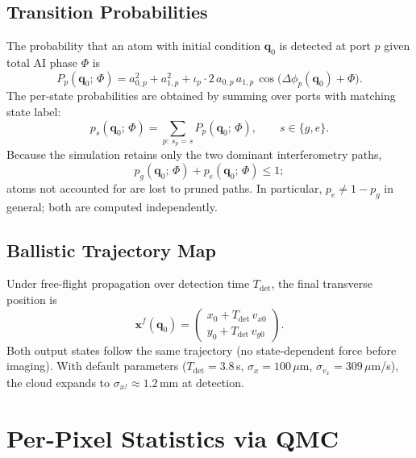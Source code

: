 \documentclass[11pt,a4paper]{article}
\newcommand{\q}{\mathbf{q}}
\newcommand{\x}{\mathbf{x}}
\begin{document}
\subsection{Transition Probabilities}

The probability that an atom with initial condition $\q_0$ is detected at port
$p$ given total AI phase $\Phi$ is
\begin{equation}
  P_p(\q_0;\,\Phi)
  = a_{0,p}^2 + a_{1,p}^2
    + \iota_p \cdot 2\,a_{0,p}\,a_{1,p}\,
      \cos\!\bigl(\Delta\phi_p(\q_0) + \Phi\bigr).
  \label{eq:port_prob}
\end{equation}
The per-state probabilities are obtained by summing over ports with matching state
label:
\begin{equation}
  p_s(\q_0;\,\Phi)
  = \sum_{p:\,s_p = s} P_p(\q_0;\,\Phi),
  \qquad s \in \{g, e\}.
  \label{eq:state_prob}
\end{equation}
Because the simulation retains only the two dominant interferometry paths,
\begin{equation}
  p_g(\q_0;\,\Phi) + p_e(\q_0;\,\Phi) \leq 1;
  \label{eq:pruning}
\end{equation}
atoms not accounted for are lost to pruned paths.  In particular,
$p_e \neq 1 - p_g$ in general; both are computed independently.

\subsection{Ballistic Trajectory Map}

Under free-flight propagation over detection time $T_\mathrm{det}$,
the final transverse position is
\begin{equation}
  \x^f(\q_0)
  =
  \begin{pmatrix}
    x_0 + T_\mathrm{det}\,v_{x0} \\
    y_0 + T_\mathrm{det}\,v_{y0}
  \end{pmatrix}.
  \label{eq:ballistic}
\end{equation}
Both output states follow the same trajectory (no state-dependent force before
imaging).  With default parameters ($T_\mathrm{det} = 3.8$\,s,
$\sigma_x = 100\,\mu$m, $\sigma_{v_x} = 309\,\mu$m/s), the cloud expands to
$\sigma_{x^f} \approx 1.2$\,mm at detection.

\section{Per-Pixel Statistics via QMC}
\label{sec:qmc}
\end{document}
